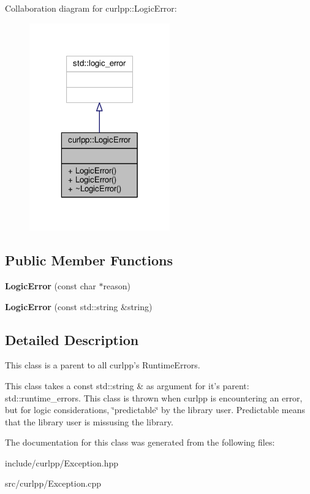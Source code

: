 Collaboration diagram for curlpp\-:\-:Logic\-Error\-:\nopagebreak
\begin{figure}[H]
\begin{center}
\leavevmode
\includegraphics[width=172pt]{classcurlpp_1_1LogicError__coll__graph}
\end{center}
\end{figure}
\subsection*{Public Member Functions}
\begin{DoxyCompactItemize}
\item 
\hypertarget{classcurlpp_1_1LogicError_a7e669f34fbb8d38de44db338d3cef4fe}{{\bfseries Logic\-Error} (const char $\ast$reason)}\label{classcurlpp_1_1LogicError_a7e669f34fbb8d38de44db338d3cef4fe}

\item 
\hypertarget{classcurlpp_1_1LogicError_aa60cf8ba5dfe9f072af9709a666ae5f8}{{\bfseries Logic\-Error} (const std\-::string \&string)}\label{classcurlpp_1_1LogicError_aa60cf8ba5dfe9f072af9709a666ae5f8}

\end{DoxyCompactItemize}


\subsection{Detailed Description}
This class is a parent to all curlpp's Runtime\-Errors. 

This class takes a const std\-::string \& as argument for it's parent\-: std\-::runtime\-\_\-errors. This class is thrown when curlpp is encountering an error, but for logic considerations, \char`\"{}predictable\char`\"{} by the library user. Predictable means that the library user is missusing the library. 

The documentation for this class was generated from the following files\-:\begin{DoxyCompactItemize}
\item 
include/curlpp/Exception.\-hpp\item 
src/curlpp/Exception.\-cpp\end{DoxyCompactItemize}
